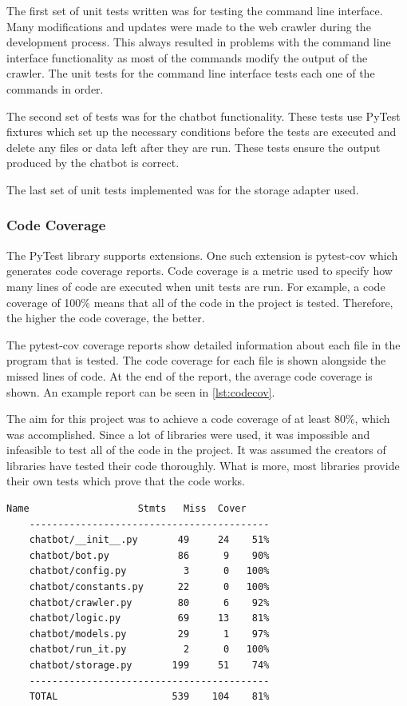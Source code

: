 \documentclass[12pt,a4paper]{article}
\newcommand{\captionstyle}[1] {
    \small{#1}
}
\begin{document}
The first set of unit tests written was for testing the command line interface. Many modifications and updates were made to the web crawler during the development process. This always resulted in problems with the command line interface functionality as most of the commands modify the output of the crawler. The unit tests for the command line interface tests each one of the commands in order.

The second set of tests was for the chatbot functionality. These tests use PyTest fixtures which set up the necessary conditions before the tests are executed and delete any files or data left after they are run. These tests ensure the output produced by the chatbot is correct. 

The last set of unit tests implemented was for the storage adapter used. 

\subsubsection{Code Coverage}
The PyTest library supports extensions. One such extension is pytest-cov which generates code coverage reports. Code coverage is a metric used to specify how many lines of code are executed when unit tests are run. For example, a code coverage of 100\% means that all of the code in the project is tested. Therefore, the higher the code coverage, the better. 

The pytest-cov coverage reports show detailed information about each file in the program that is tested. The code coverage for each file is shown alongside the missed lines of code. At the end of the report, the average code coverage is shown. An example report can be seen in \cref{lst:codecov}.

The aim for this project was to achieve a code coverage of at least 80\%, which was accomplished. Since a lot of libraries were used, it was impossible and infeasible to test all of the code in the project. It was assumed the creators of libraries have tested their code thoroughly. What is more, most libraries provide their own tests which prove that the code works.

\begin{minipage}{\linewidth}
    \begin{lstlisting}[caption={\captionstyle{A code coverage report produced with pytest-cov.}}, label={lst:codecov}]
    Name                   Stmts   Miss  Cover
    ------------------------------------------
    chatbot/__init__.py       49     24    51%
    chatbot/bot.py            86      9    90%
    chatbot/config.py          3      0   100%
    chatbot/constants.py      22      0   100%
    chatbot/crawler.py        80      6    92%
    chatbot/logic.py          69     13    81%
    chatbot/models.py         29      1    97%
    chatbot/run_it.py          2      0   100%
    chatbot/storage.py       199     51    74%
    ------------------------------------------
    TOTAL                    539    104    81%    
    \end{lstlisting}
\end{minipage}
\end{document}
